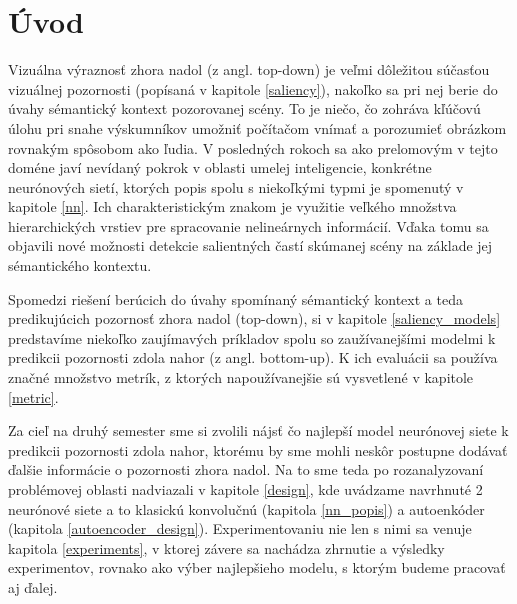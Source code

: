\newpage
\null
\thispagestyle{empty}
\newpage
\section{Úvod}
\setcounter{page}{1}

Vizuálna výraznosť zhora nadol (z angl. top-down) je veľmi dôležitou súčasťou vizuálnej pozornosti (popísaná v kapitole \ref{saliency}), nakoľko sa pri nej berie do úvahy sémantický kontext pozorovanej scény. To je niečo, čo zohráva kľúčovú úlohu pri snahe výskumníkov umožniť počítačom vnímať a porozumieť obrázkom rovnakým spôsobom ako ľudia. V posledných rokoch sa ako prelomovým v tejto doméne javí nevídaný pokrok v oblasti umelej inteligencie, konkrétne neurónových sietí, ktorých popis spolu s niekoľkými typmi je spomenutý v kapitole \ref{nn}. Ich charakteristickým znakom je využitie veľkého množstva hierarchických vrstiev pre spracovanie nelineárnych informácií. Vďaka tomu sa objavili nové možnosti detekcie salientných častí skúmanej scény na základe jej sémantického kontextu.

Spomedzi riešení berúcich do úvahy spomínaný sémantický kontext a teda predikujúcich pozornosť zhora nadol (top-down), si v kapitole \ref{saliency_models} predstavíme niekoľko zaujímavých príkladov spolu so zaužívanejšími modelmi k predikcii pozornosti zdola nahor (z angl. bottom-up). K ich evaluácii sa používa značné množstvo metrík, z ktorých napoužívanejšie sú vysvetlené v kapitole \ref{metric}.

Za cieľ na druhý semester sme si  zvolili nájsť čo najlepší model neurónovej siete k predikcii pozornosti zdola nahor, ktorému by sme mohli neskôr postupne dodávať ďalšie informácie o pozornosti zhora nadol. Na to sme teda po rozanalyzovaní problémovej oblasti nadviazali v kapitole \ref{design}, kde uvádzame navrhnuté 2 neurónové siete a to klasickú konvolučnú (kapitola \ref{nn_popis}) a autoenkóder (kapitola \ref{autoencoder_design}). Experimentovaniu nie len s nimi sa venuje kapitola \ref{experiments}, v ktorej závere sa nachádza zhrnutie a výsledky experimentov, rovnako ako výber najlepšieho modelu, s ktorým budeme pracovať aj ďalej. 

\newpage
\null
\thispagestyle{empty}



